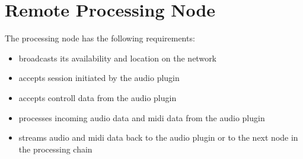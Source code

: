 \section{Remote Processing Node}

The processing node has the following requirements:
\begin{itemize}

\item broadcasts its availability and location on the network
\item accepts session initiated by the audio plugin
\item accepts controll data from the audio plugin
\item processes incoming audio data and midi data from the audio plugin
\item streams audio and midi data back to the audio plugin or to the next node in the processing chain

\end{itemize}
